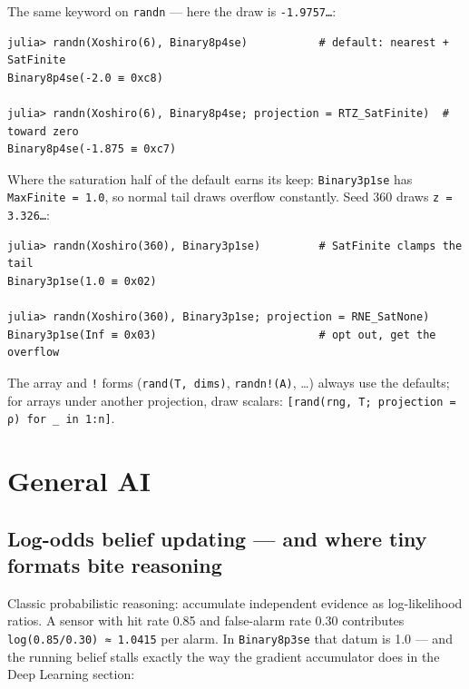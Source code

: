 The same keyword on \texttt{randn} — here the draw is \texttt{-1.9757…}:




\begin{verbatim}
julia> randn(Xoshiro(6), Binary8p4se)           # default: nearest + SatFinite
Binary8p4se(-2.0 ≡ 0xc8)

julia> randn(Xoshiro(6), Binary8p4se; projection = RTZ_SatFinite)  # toward zero
Binary8p4se(-1.875 ≡ 0xc7)
\end{verbatim}



Where the saturation half of the default earns its keep: \texttt{Binary3p1se} has \texttt{MaxFinite = 1.0}, so normal tail draws overflow constantly. Seed 360 draws \texttt{z = 3.326…}:




\begin{verbatim}
julia> randn(Xoshiro(360), Binary3p1se)         # SatFinite clamps the tail
Binary3p1se(1.0 ≡ 0x02)

julia> randn(Xoshiro(360), Binary3p1se; projection = RNE_SatNone)
Binary3p1se(Inf ≡ 0x03)                         # opt out, get the overflow
\end{verbatim}



The array and \texttt{!} forms (\texttt{rand(T, dims)}, \texttt{randn!(A)}, …) always use the defaults; for arrays under another projection, draw scalars: \texttt{[rand(rng, T; projection = ρ) for \_ in 1:n]}.



\section{General AI}



\label{12995498770613901834}{}


\subsection{Log-odds belief updating — and where tiny formats bite reasoning}



\label{12572314235496160742}{}


Classic probabilistic reasoning: accumulate independent evidence as log-likelihood ratios. A sensor with hit rate 0.85 and false-alarm rate 0.30 contributes \texttt{log(0.85/0.30) ≈ 1.0415} per alarm. In \texttt{Binary8p3se} that datum is 1.0 — and the running belief stalls exactly the way the gradient accumulator does in the Deep Learning section:




